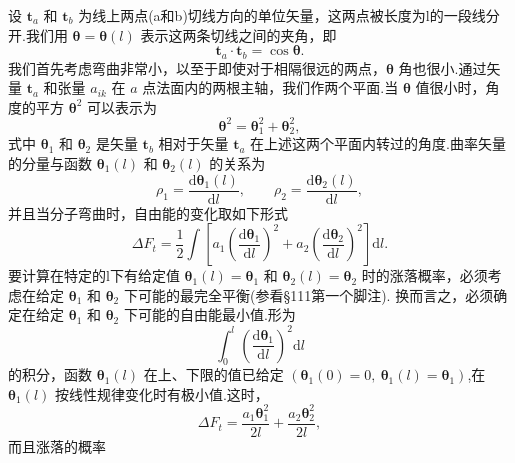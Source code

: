 设 $\boldsymbol{t}_a$ 和 $\boldsymbol{t}_b$ 为线上两点(a和b)切线方向的单位矢量，这两点被长度为l的一段线分开.我们用 $\boldsymbol{\theta}=\boldsymbol{\theta}(l)$ 表示这两条切线之间的夹角，即
\begin{equation*}
  \boldsymbol{t}_a\cdot\boldsymbol{t}_b=\cos\boldsymbol{\theta}.
\end{equation*}
我们首先考虑弯曲非常小，以至于即使对于相隔很远的两点，$\boldsymbol{\theta}$ 角也很小.通过矢量 $\boldsymbol{t}_a$ 和张量 $a_{ik}$ 在 $a$ 点法面内的两根主轴，我们作两个平面.当 $\boldsymbol{\theta}$ 值很小时，角度的平方 $\boldsymbol{\theta}^2$ 可以表示为
\begin{equation}
  \boldsymbol{\theta}^2=\boldsymbol{\theta}_1^2+\boldsymbol{\theta}_2^2,
\end{equation}
式中 $\boldsymbol{\theta}_1$ 和 $\boldsymbol{\theta}_2$ 是矢量 $\boldsymbol{t}_b$ 相对于矢量 $\boldsymbol{t}_a$ 在上述这两个平面内转过的角度.曲率矢量的分量与函数 $\boldsymbol{\theta}_1(l)$ 和 $\boldsymbol{\theta}_2(l)$ 的关系为
\begin{equation*}
  \rho_1=\frac{\mathrm{d}\boldsymbol{\theta}_1(l)}{\mathrm{d}l},\qquad
  \rho_2=\frac{\mathrm{d}\boldsymbol{\theta}_2(l)}{\mathrm{d}l},
\end{equation*}
并且当分子弯曲时，自由能的变化取如下形式
\begin{equation}
  \Delta F_t=\frac{1}{2}\int\left[a_1\left(\frac{\mathrm{d}\boldsymbol{\theta}_1}{\mathrm{d}l}\right)^2
  +a_2\left(\frac{\mathrm{d}\boldsymbol{\theta}_2}{\mathrm{d}l}\right)^2\right]\mathrm{d}l.
\end{equation}
要计算在特定的l下有给定值 $\boldsymbol{\theta}_1(l)=\boldsymbol{\theta}_1$ 和 $\boldsymbol{\theta}_2(l)=\boldsymbol{\theta}_2$ 时的涨落概率，必须考虑在给定 $\boldsymbol{\theta}_1$ 和 $\boldsymbol{\theta}_2$ 下可能的最完全平衡(参看§111第一个脚注). 换而言之，必须确定在给定 $\boldsymbol{\theta}_1$ 和 $\boldsymbol{\theta}_2$ 下可能的自由能最小值.形为
\begin{equation*}
  \int_0^l\left(\frac{\mathrm{d}\boldsymbol{\theta}_1}{\mathrm{d}l}\right)^2\mathrm{d}l
\end{equation*}
的积分，函数 $\boldsymbol{\theta}_1(l)$ 在上、下限的值已给定 $(\boldsymbol{\theta}_1(0)=0,\ \boldsymbol{\theta}_1(l)=\boldsymbol{\theta}_1)$,在 $\boldsymbol{\theta}_1(l)$ 按线性规律变化时有极小值.这时，
\begin{equation*}
  \Delta F_t=\frac{a_1\boldsymbol{\theta}_1^2}{2l}
  +\frac{a_2\boldsymbol{\theta}_2^2}{2l},
\end{equation*}
而且涨落的概率
